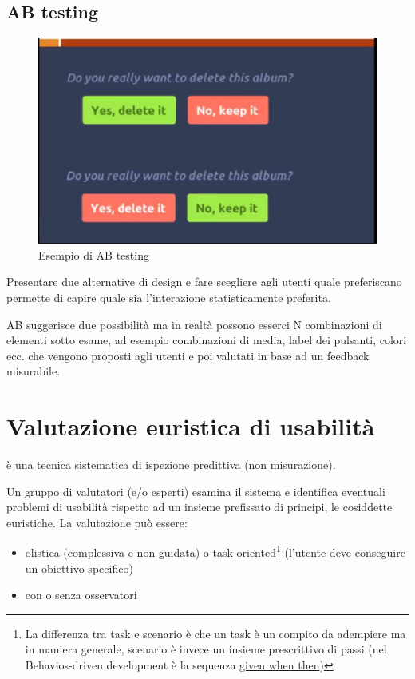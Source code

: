 \documentclass[11pt,a4paper]{book}
\begin{document}
\subsection{AB testing}
\begin{figure}[h!]
	\begin{center}
		\includegraphics[scale=0.6]{img/019.jpg}
		\caption{Esempio di AB testing}
		\label{fig: 019}
	\end{center}
\end{figure}
Presentare due alternative di design e fare scegliere agli utenti quale preferiscano permette di capire quale sia l'interazione statisticamente preferita.

AB suggerisce due possibilità ma in realtà possono esserci N combinazioni di elementi sotto esame, ad esempio combinazioni di media, label dei pulsanti, colori ecc. che vengono proposti agli utenti e poi valutati in base ad un feedback misurabile.

\section{Valutazione euristica di usabilità}
è una tecnica sistematica di ispezione predittiva (non misurazione).

Un gruppo di valutatori (e/o esperti) esamina il sistema e identifica eventuali problemi di usabilità rispetto ad un insieme prefissato di principi, le cosiddette euristiche. La valutazione può essere:
\begin{itemize}
	\item olistica (complessiva e non guidata) o task oriented\footnote{La differenza tra task e scenario è che un task è un compito da adempiere ma in maniera generale, scenario è invece un insieme prescrittivo di passi (nel Behavios-driven development è la sequenza \href{https://martinfowler.com/bliki/GivenWhenThen.html}{given when then})} (l'utente deve conseguire un obiettivo specifico)
	\item con o senza osservatori
\end{itemize}
\end{document}

